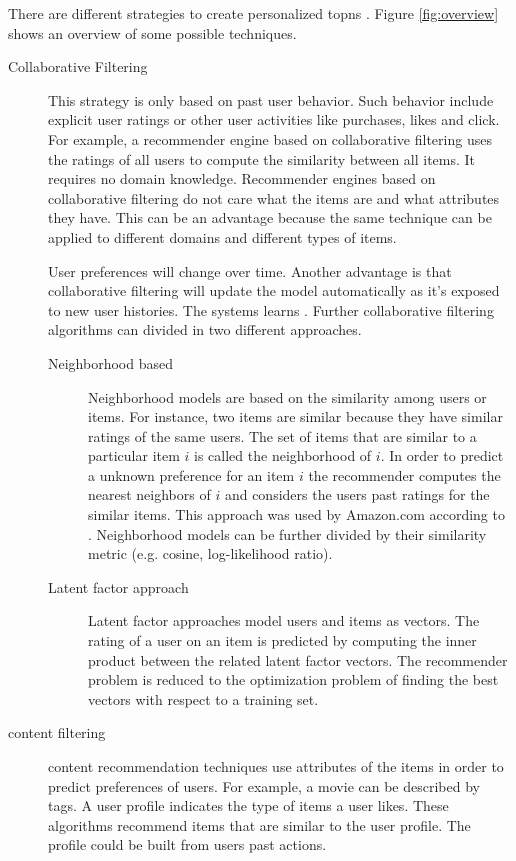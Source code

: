 There are different strategies to create personalized \glspl{topn} \cite{jannach11}. Figure \ref{fig:overview} shows an overview of some possible techniques.

\begin{description}
\item[Collaborative Filtering] This strategy is only based on past user behavior. Such behavior include explicit user ratings or other user activities like purchases, likes and click. For example, a recommender engine based on collaborative filtering uses the ratings of all users to compute the similarity between all items. 
It requires no domain knowledge. Recommender engines based on collaborative filtering do not care what the items are and what attributes they have. This can be an advantage because the same technique can be applied to different domains and different types of items. 

User preferences will change over time. Another advantage is that collaborative filtering will update the model automatically as it's exposed to new user histories. The systems learns
.
Further collaborative filtering algorithms can divided in two different approaches.
\begin{description}
\item[Neighborhood based] Neighborhood models are based on the similarity among users or items. For instance, two items are similar because they have similar ratings of the same users. The set of items that are similar to a particular item $i$ is called the neighborhood of $i$. In order to predict a unknown preference for an item $i$ the recommender computes the nearest neighbors of $i$ and considers the users past ratings for the similar items. This approach was used by Amazon.com according to \cite{Linden}. Neighborhood models can be further divided by their similarity metric (e.g. cosine, log-likelihood ratio).
\item[Latent factor approach] Latent factor approaches model users and items as vectors. The rating of a user on an item is predicted by computing the inner product between the related latent factor vectors. The recommender problem is reduced to the optimization problem of finding the best vectors with respect to a training set.
\end{description}
\item[\gls{content} filtering] \gls{content} recommendation techniques use attributes of the items in order to predict preferences of users. For example, a movie can be described by \glspl{tag}. A user profile indicates the type of items a user likes. These algorithms recommend items that are similar to the user profile. The profile could be built from users past actions.
\end{description}



